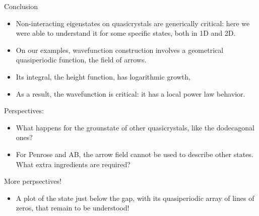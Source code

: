 \documentclass[xcolor=x11names,compress,professionalfonts]{beamer}
\renewcommand{\(}{\begin{columns}}
\renewcommand{\)}{\end{columns}}
\newcommand{\<}[1]{\begin{column}{#1}}
\renewcommand{\>}{\end{column}}
\begin{document}
\begin{frame}{Conclusion}
\begin{itemize}
	\item Non-interacting eigenstates on quasicrystals are generically critical: here we were able to understand it for some specific states, both in 1D and 2D.
	\item On our examples, wavefunction construction involves a geometrical quasiperiodic function, the field of arrows.
	\item Its integral, the height function, has logarithmic growth,
	\item As a result, the wavefunction is critical: it has a local power law behavior.
\end{itemize}
Perspectives:
\begin{itemize}
	\item What happens for the grounstate of other quasicrystals, like the dodecagonal ones?
	\item For Penrose and AB, the arrow field cannot be used to describe other states. What extra ingredients are required?
\end{itemize}
\end{frame}

\begin{frame}{More perpsectives!}
\begin{itemize}
	\item A plot of the state just below the gap, with its quasiperiodic array of lines of zeros, that remain to be understood!
\end{itemize}
\end{frame}
\end{document}
